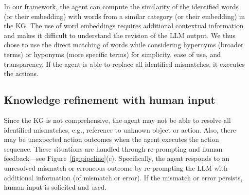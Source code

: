 In our framework, the agent can compute the similarity of the identified words (or their embedding) with words from a similar category (or their embedding) in the KG. The use of word embeddings requires additional contextual information and makes it difficult to understand the revision of the LLM output. We thus chose to use the direct matching of words while considering hypernyms (broader terms) or hyponyms (more specific terms) for simplicity, ease of use, and transparency. If the agent is able to replace all identified mismatches, it executes the actions. 


\subsection{Knowledge refinement with human input}
\label{sec:framework-hitl}
Since the KG is not comprehensive, the agent may not be able to resolve all identified mismatches, e.g., reference to unknown object or action. Also, there may be unexpected action outcomes when the agent executes the action sequence. These situations are handled through re-prompting and human feedback---see Figure~\ref{fig:pipeline}(c).
Specifically, the agent responds to an unresolved mismatch or erroneous outcome by re-prompting the LLM with additional information (of mismatch or error). If the mismatch or error persists, human input is solicited and used. 

